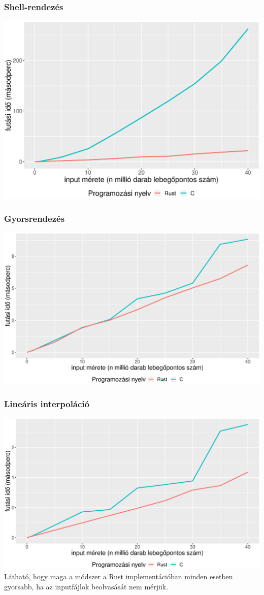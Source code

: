 \subsubsection{Shell-rendezés}
\includegraphics[width=15.5cm]{kepek/shells_sort_run_without_read.eps}
\subsubsection{Gyorsrendezés}
\includegraphics[width=15.5cm]{kepek/quicksort_run_without_read.eps}
\subsubsection{Lineáris interpoláció}
\includegraphics[width=15.5cm]{kepek/linear_interpolation_run_without_read.eps}
Látható, hogy maga a módszer a Rust implementációban minden esetben gyorsabb, ha az inputfájlok beolvasását nem mérjük.

